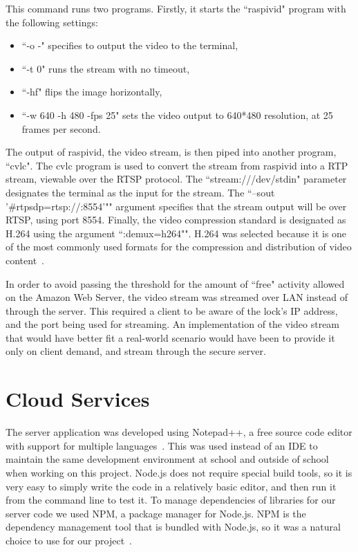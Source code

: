 \documentclass[12pt]{report}
\let\Oldsection\section
\renewcommand{\section}{\FloatBarrier\Oldsection}
\begin{document}
This command runs two programs. Firstly, it starts the ``raspivid" program with the following settings:
\begin{itemize}
    \item ``-o -" specifies to output the video to the terminal,
    \item ``-t 0" runs the stream with no timeout,
    \item ``-hf" flips the image horizontally,
    \item ``-w 640 -h 480 -fps 25" sets the video output to 640*480 resolution, at 25 frames per second.
\end{itemize}

The output of raspivid, the video stream, is then piped into another program, ``cvlc". The cvlc program is used to 
convert the stream from raspivid into a RTP stream, viewable over the RTSP protocol. The ``stream:///dev/stdin" 
parameter designates the terminal as the input for the stream. The ``--sout '\#rtp{sdp=rtsp://:8554}'"" argument specifies 
that the stream output will be over RTSP, using port 8554. Finally, the video compression standard is designated as 
H.264 using the argument ``:demux=h264"". H.264 was selected because it is one of the most commonly used formats for 
the compression and distribution of video content~\autocite{H264}.

In order to avoid passing the threshold for the amount of ``free" activity allowed on the Amazon Web Server, the video 
stream was streamed over LAN instead of through the server. This required a client to be aware of the lock's IP 
address, and the port being used for streaming. An implementation of the video stream that would have better fit a 
real-world scenario would have been to provide it only on client demand, and stream through the secure server.


\section{Cloud Services} \label{cloud-services}

The server application was developed using Notepad++, a free source code editor with support
for multiple languages~\autocite{NOTEPADPLUSPLUS}. This was used instead of an IDE to maintain the same development
environment at school and outside of school when working on this project. Node.js does not
require special build tools, so it is very easy to simply write the code in a relatively basic
editor, and then run it from the command line to test it. To manage dependencies of libraries
for our server code we used NPM, a package manager for Node.js. NPM is the dependency management
tool that is bundled with Node.js, so it was a natural choice to use for our project~\autocite{NODENPM}.
\end{document}
